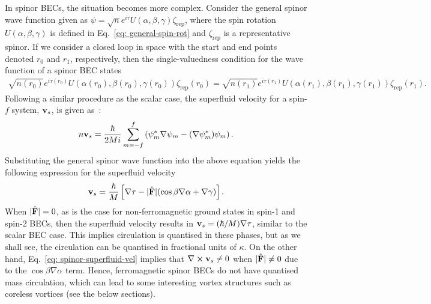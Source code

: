 In spinor BECs, the situation becomes more complex.
Consider the general spinor wave function given as \(\psi =
\sqrt{n}e^{i\tau}U(\alpha, \beta, \gamma)\zeta_\text{rep}\), where the spin
rotation \(U(\alpha, \beta, \gamma)\) is defined in
Eq.~\eqref{eq: general-spin-rot} and \(\zeta_\text{rep}\) is a representative
spinor.
If we consider a closed loop in space with the start and end points denoted
\(r_0\) and \(r_1\), respectively, then the single-valuedness condition for the
wave function of a spinor BEC states~\cite{Kawaguchi2012}
\begin{align}
    \sqrt{n(r_0)}e^{i\tau(r_0)}U(\alpha(r_0), \beta(r_0), \gamma(r_0))
    \zeta_\text{rep}(r_0) = \sqrt{n(r_1)}e^{i\tau(r_1)}
    U(\alpha(r_1), \beta(r_1), \gamma(r_1)) \zeta_\text{rep}(r_1).
\end{align}
Following a similar procedure as the scalar case, the superfluid velocity for a
spin-\(f\) system, \(\vb{v}_s\), is given as~\cite{Kawaguchi2012}:
\begin{align}\label{eq: spinor-mass-current}
    n\vb{v}_s = \frac{\hbar}{2Mi}\sum_{m=-f}^f\left(\psi^*_m\nabla\psi_m
    - {(\nabla \psi_m^*)}\psi_m\right).
\end{align}
Substituting the general spinor wave function into the above equation yields
the following expression for the superfluid velocity
\begin{align}\label{eq: spinor-superfluid-vel}
    \vb{v}_s = \frac{\hbar}{M}\left[\nabla\tau - |\hat{\vb{F}}| (
        \cos\beta\nabla\alpha + \nabla\gamma)\right].
\end{align}
When \(|\hat{\vb{F}}| = 0\), as is the case for non-ferromagnetic ground states
in spin-1 and spin-2 BECs, then the superfluid velocity results in
\(\vb{v}_s=(\hbar/M)\nabla\tau \), similar to the scalar BEC case.
This implies circulation is quantised in these phases, but as we shall see, the
circulation can be quantised in fractional units of \(\kappa \).
On the other hand, Eq.~\eqref{eq: spinor-superfluid-vel} implies that
\(\nabla \cross \vb{v}_s \neq 0\) when \(|\hat{\vb{F}}| \neq 0\) due to the
\(\cos\beta\nabla\alpha \) term.
Hence, ferromagnetic spinor BECs do not have quantised mass circulation, which
can lead to some interesting vortex structures such as coreless vortices
(see the below sections).

